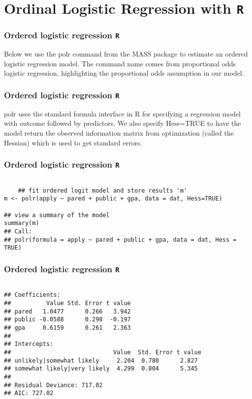 \documentclass[00-GLMregslides.tex]{subfiles}
\begin{document}
\newpage
\Large

\section{Ordinal Logistic Regression with \texttt{R}}


\begin{frame}[fragile]
	\frametitle{Ordered logistic regression \texttt{R} }
	\Large

Below we use the polr command from the MASS package to estimate an ordered logistic regression model. The command name comes from proportional odds logistic regression, highlighting the proportional odds assumption in our model. 
\end{frame}
\begin{frame}[fragile]
	\frametitle{Ordered logistic regression \texttt{R} }
	\Large
	polr uses the standard formula interface in R for specifying a regression model with outcome followed by predictors. We also specify Hess=TRUE to have the model return the observed information matrix from optimization (called the Hessian) which is used to get standard errors.
\end{frame}
\begin{frame}[fragile]
	\frametitle{Ordered logistic regression \texttt{R} }
	\Large
\begin{framed}		
	\begin{verbatim}
	
	## fit ordered logit model and store results 'm'
m <- polr(apply ~ pared + public + gpa, data = dat, Hess=TRUE)

## view a summary of the model
summary(m)
## Call:
## polr(formula = apply ~ pared + public + gpa, data = dat, Hess = TRUE)
\end{verbatim}
\end{framed}
\end{frame}
\begin{frame}[fragile]
	\frametitle{Ordered logistic regression \texttt{R} }
	\Large
\begin{framed}		
	\begin{verbatim}
		
## Coefficients:
##          Value Std. Error t value
## pared   1.0477      0.266   3.942
## public -0.0588      0.298  -0.197
## gpa     0.6159      0.261   2.363
## 
## Intercepts:
##                             Value  Std. Error t value
## unlikely|somewhat likely     2.204  0.780      2.827 
## somewhat likely|very likely  4.299  0.804      5.345 
## 
## Residual Deviance: 717.02 
## AIC: 727.02
\end{verbatim}
\end{framed}
\end{frame}
\end{document}
